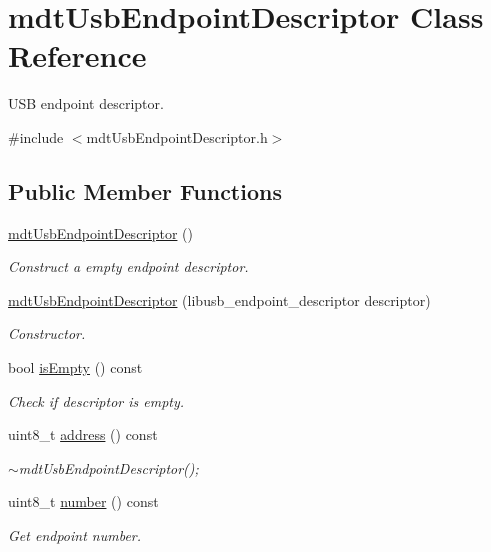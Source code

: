 \hypertarget{classmdt_usb_endpoint_descriptor}{\section{mdt\-Usb\-Endpoint\-Descriptor Class Reference}
\label{classmdt_usb_endpoint_descriptor}
}


U\-S\-B endpoint descriptor.  




{\ttfamily \#include $<$mdt\-Usb\-Endpoint\-Descriptor.\-h$>$}

\subsection*{Public Member Functions}
\begin{DoxyCompactItemize}
\item 
\hyperlink{classmdt_usb_endpoint_descriptor_adf827037bb0a066e8eeabf9d96145e7f}{mdt\-Usb\-Endpoint\-Descriptor} ()
\begin{DoxyCompactList}\small\item\em Construct a empty endpoint descriptor. \end{DoxyCompactList}\item 
\hyperlink{classmdt_usb_endpoint_descriptor_a11c0d963b1c00a2b82530a6dd216f5c1}{mdt\-Usb\-Endpoint\-Descriptor} (libusb\-\_\-endpoint\-\_\-descriptor descriptor)
\begin{DoxyCompactList}\small\item\em Constructor. \end{DoxyCompactList}\item 
bool \hyperlink{classmdt_usb_endpoint_descriptor_a2f29e8ade053442a80ee1e97fbfc3792}{is\-Empty} () const 
\begin{DoxyCompactList}\small\item\em Check if descriptor is empty. \end{DoxyCompactList}\item 
uint8\-\_\-t \hyperlink{classmdt_usb_endpoint_descriptor_aae9f5432aa5a4c4658d9383fbe0f1808}{address} () const 
\begin{DoxyCompactList}\small\item\em $\sim$mdt\-Usb\-Endpoint\-Descriptor(); \end{DoxyCompactList}\item 
uint8\-\_\-t \hyperlink{classmdt_usb_endpoint_descriptor_ac27a176118a68e93d9a71e89b304c614}{number} () const 
\begin{DoxyCompactList}\small\item\em Get endpoint number. \end{DoxyCompactList}\item 

\end{DoxyCompactItemize}
